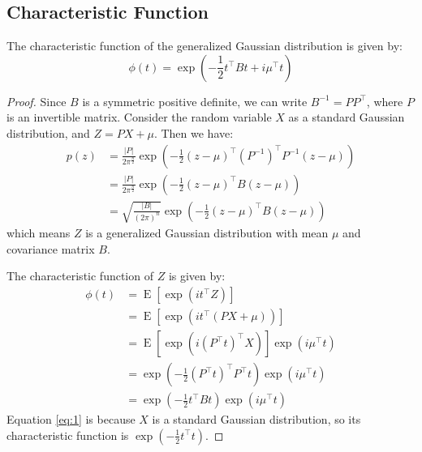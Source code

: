 \documentclass[12pt]{article}
\begin{document}
\subsection{Characteristic Function}
The characteristic function of the generalized Gaussian distribution is given by:
\begin{equation}
    \phi(t)=\exp\left(-\frac{1}{2}t^{\top}Bt+i\mu^{\top}t\right)
\end{equation}
\begin{proof}
    Since $B$ is a symmetric positive definite, we can write $B^{-1}=P P^{\top}$, where $P$ is an invertible matrix.
    Consider the random variable $X$ as a standard Gaussian distribution, and $Z=PX + \mu$. Then we have:
    \begin{align}
        p(z) & = \frac{|P|}{2\pi^\frac{n}{2}} \exp\left(-\frac{1}{2}(z-\mu)^{\top}(P^{-1})^{\top}P^{-1}(z-\mu)\right) \\
             & = \frac{|P|}{2\pi^\frac{n}{2}} \exp\left(-\frac{1}{2}(z-\mu)^{\top}B(z-\mu)\right)                     \\
             & = \sqrt{\frac{|B|}{(2\pi)^n}} \exp\left(-\frac{1}{2}(z-\mu)^{\top}B(z-\mu)\right)
    \end{align}
    which means $Z$ is a generalized Gaussian distribution with mean $\mu$ and covariance matrix $B$.

    The characteristic function of $Z$ is given by:
    \begin{align}
        \phi(t) & = \operatorname{E}[\exp(i t^{\top}Z)]                                                      \\
                & = \operatorname{E}[\exp(i t^{\top}(PX+\mu))]                                               \\
                & = \operatorname{E}[\exp(i (P^{\top}t)^{\top}X)] \exp(i\mu^{\top}t)                         \\
                & = \exp\left(-\frac{1}{2}(P^{\top}t)^{\top}P^{\top}t\right) \exp(i\mu^{\top}t) \label{eq:1} \\
                & = \exp\left(-\frac{1}{2}t^{\top}Bt\right) \exp(i\mu^{\top}t)
    \end{align}
    Equation \ref{eq:1} is because $X$ is a standard Gaussian distribution, so its characteristic function is $\exp\left(-\frac{1}{2}t^{\top}t\right)$.
\end{proof}
\end{document}
